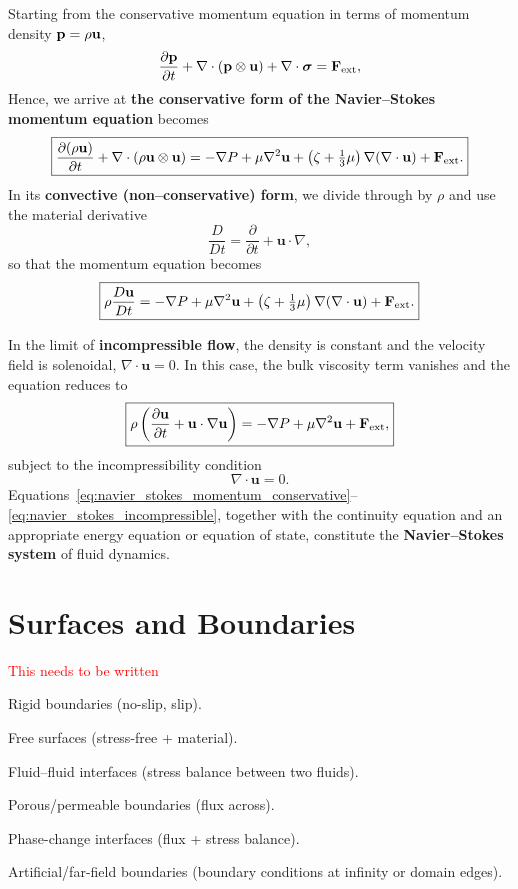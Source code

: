 \noindent
Starting from the conservative momentum equation in terms of momentum density 
${\bf p} = \rho {\bf u}$,
\begin{equation}
\frac{\partial {\bf p}}{\partial t} + \nabla \cdot ({\bf p} \otimes {\bf u}) + \nabla \cdot \boldsymbol{\sigma} = {\bf F}_{\rm ext},
\end{equation}
Hence, we arrive at \textbf{the conservative form of the Navier--Stokes momentum equation} becomes
\begin{equation}
\label{eq:navier_stokes_momentum_conservative}
\boxed{
\frac{\partial (\rho \mathbf{u})}{\partial t}
+ \nabla \cdot (\rho \mathbf{u}\otimes \mathbf{u})
= -\nabla P + \mu \nabla^2 \mathbf{u}
+ \left(\zeta + \tfrac{1}{3}\mu\right)\nabla(\nabla \cdot \mathbf{u})
+ {\bf F}_{\rm ext}.}
\end{equation}
In its \textbf{convective (non--conservative) form}, we divide through by $\rho$ and use the material derivative
\[
\frac{D}{Dt} = \frac{\partial}{\partial t} + \mathbf{u}\cdot\nabla,
\]
so that the momentum equation becomes
\begin{equation}
\label{eq:navier_stokes_momentum_convective}
\boxed{
\rho \frac{D \mathbf{u}}{Dt}
= -\nabla P + \mu \nabla^2 \mathbf{u}
+ \left(\zeta + \tfrac{1}{3}\mu\right)\nabla(\nabla \cdot \mathbf{u})
+ {\bf F}_{\rm ext}.}
\end{equation}

\noindent
In the limit of \textbf{incompressible flow}, the density is constant and the velocity field is solenoidal, $\nabla\cdot \mathbf{u} = 0$. In this case, the bulk viscosity term vanishes and the equation reduces to
\begin{equation}
\label{eq:navier_stokes_incompressible}
\boxed{
\rho \left(\frac{\partial \mathbf{u}}{\partial t} + \mathbf{u}\cdot\nabla \mathbf{u}\right)
= -\nabla P + \mu \nabla^2 \mathbf{u} + {\bf F}_{\rm ext},}
\end{equation}
subject to the incompressibility condition
\begin{equation}
\nabla \cdot \mathbf{u} = 0.
\end{equation}
\medskip
\noindent
Equations~\eqref{eq:navier_stokes_momentum_conservative}--\eqref{eq:navier_stokes_incompressible}, together with the continuity equation and an appropriate energy equation or equation of state, constitute the \textbf{Navier--Stokes system} of fluid dynamics.

\section{Surfaces and Boundaries}

\textcolor{red}{This needs to be written}

Rigid boundaries (no-slip, slip).

Free surfaces (stress-free + material).

Fluid–fluid interfaces (stress balance between two fluids).

Porous/permeable boundaries (flux across).

Phase-change interfaces (flux + stress balance).

Artificial/far-field boundaries (boundary conditions at infinity or domain edges).

